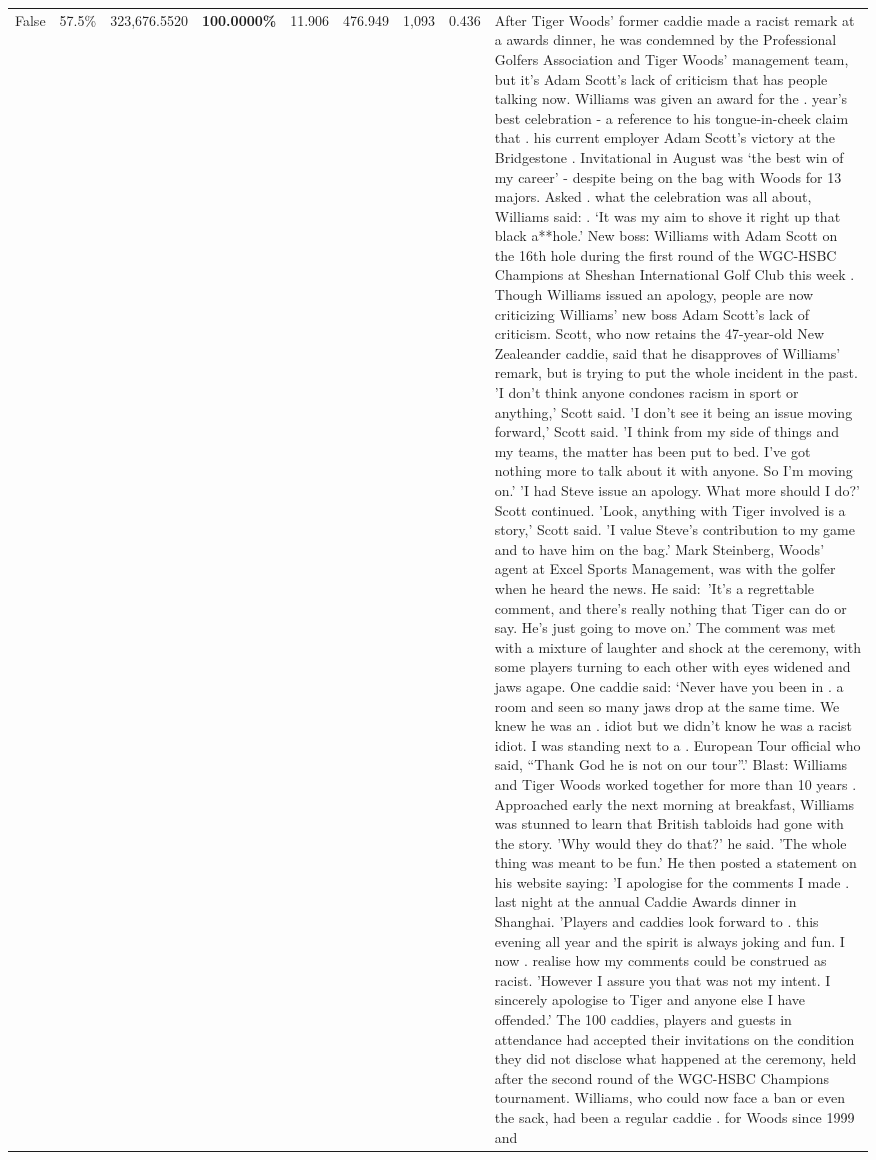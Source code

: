 \begin{table}[H]
\begin{tabular}{lllrlllll}
False & 57.5\% & 323,676.5520 & \bfseries \color{red} 100.0000\% & 11.906 & 476.949 & 1,093 & 0.436 & After Tiger Woods' former caddie made a racist remark at a awards dinner, he was condemned by the Professional Golfers Association and Tiger Woods' management team, but it's Adam Scott's lack of criticism that has people talking now. Williams was given an award for the . year’s best celebration - a reference to his tongue-in-cheek claim that . his current employer Adam Scott’s victory at the Bridgestone . Invitational in August was ‘the best win of my career’ - despite being on the bag with Woods for 13 majors. Asked . what the celebration was all about, Williams said: . ‘It was my aim to shove it right up that black a**hole.’ New boss: Williams with Adam Scott  on the 16th hole during the first round of the WGC-HSBC Champions at Sheshan International Golf Club this week . Though Williams issued an apology, people are now criticizing Williams' new boss Adam Scott's lack of criticism. Scott, who now retains the 47-year-old New Zealeander caddie, said that he disapproves of Williams' remark, but is trying to put the whole incident in the past. 'I don't think anyone condones racism in sport or anything,' Scott said. 'I don't see it being an issue moving forward,' Scott said. 'I think from my side of things and my teams, the matter has been put to bed. I've got nothing more to talk about it with anyone. So I'm moving on.' 'I had Steve issue an apology. What more should I do?' Scott continued. 'Look, anything with Tiger involved is a story,' Scott said. 'I value Steve's contribution to my game and to have him on the bag.' Mark Steinberg, Woods' agent at Excel Sports Management, was with the golfer when he heard the news. He said: 'It's a regrettable comment, and there's really nothing that Tiger can do or say. He's just going to move on.' The comment was met with a mixture of laughter and shock at the ceremony, with some players turning to each other with eyes widened and jaws agape. One caddie said: ‘Never have you been in . a room and seen so many jaws drop at the same time. We knew he was an . idiot but we didn’t know he was a racist idiot. I was standing next to a . European Tour official who said, “Thank God he is not on our tour”.’ Blast: Williams and Tiger Woods worked together for more than 10 years . Approached early the next morning at breakfast, Williams was stunned to learn that British tabloids had gone with the story. 'Why would they do that?' he said. 'The whole thing was meant to be fun.' He then posted a statement on his website saying: 'I apologise for the comments I made . last night at the annual Caddie Awards dinner in Shanghai. 'Players and caddies look forward to . this evening all year and the spirit is always joking and fun. I now . realise how my comments could be construed as racist. 'However I assure you that was not my intent. I sincerely apologise to Tiger and anyone else I have offended.' The 100 caddies, players and guests in attendance had accepted their invitations on the condition they did not disclose what happened at the ceremony, held after the second round of the WGC-HSBC Champions tournament. Williams, who could now face a ban or even the sack, had been a regular caddie . for Woods since 1999 and 
\end{tabular}
\end{table}
